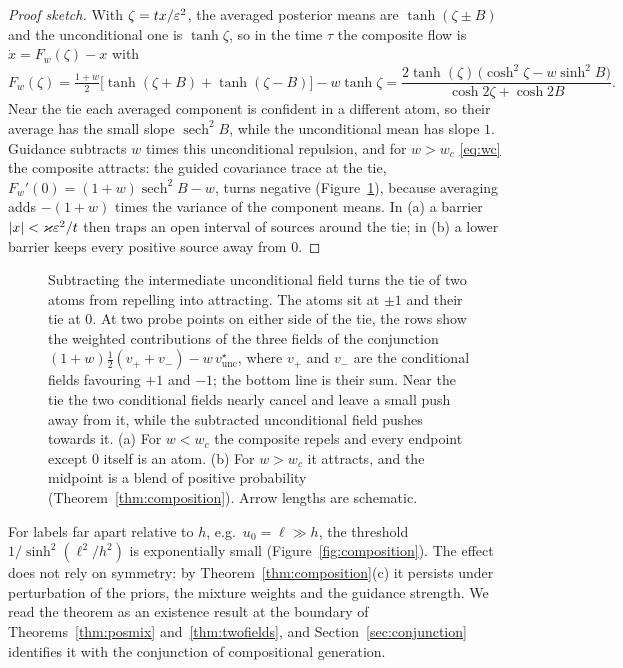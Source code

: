 \documentclass{article} %
\newif\ificlr
\theoremstyle{plain}
\theoremstyle{definition}
\theoremstyle{remark}
\newenvironment{proofsketch}{\begin{proof}[Proof sketch]}{\end{proof}}
\begin{document}
\newcommand{\compositioneq}{%
\begin{equation}
F_w(\zeta)=\tfrac{1+w}2\big[\tanh(\zeta+B)+\tanh(\zeta-B)\big]-w\tanh \zeta
=\frac{2\tanh(\zeta)\,\big(\cosh^2\zeta-w\sinh^2B\big)}{\cosh2\zeta+\cosh2B}.
\label{eq:composition-mean}
\end{equation}}
\ificlr
With $\zeta=tx/\eps^2$, in the time $\tau$ the composite flow is $\dot x=F_w(\zeta)-x$ with
\compositioneq
At the tie the averaged posterior mean has slope $\operatorname{sech}^2B$ and the unconditional one slope~$1$, so the slope $F_w'(0)=(1+w)\operatorname{sech}^2B-w$ turns negative, and the tie attracts, exactly when $w>1/\sinh^2B$; the proof is in Appendix~\ref{apx:pf-composition}.
\else
\begin{proofsketch}
With $\zeta=tx/\eps^2$, the averaged posterior means are $\tanh(\zeta\pm B)$ and the unconditional one
is $\tanh \zeta$, so in the time $\tau$ the composite flow is $\dot x=F_w(\zeta)-x$ with
\compositioneq
Near the tie each averaged component is confident in a different atom, so their average has the
small slope $\operatorname{sech}^2B$, while the unconditional mean has slope $1$. Guidance
subtracts $w$ times this unconditional repulsion, and for $w>w_c$ \eqref{eq:wc} the composite attracts:
the guided covariance trace at the tie, $F_w'(0)=(1+w)\operatorname{sech}^2B-w$, turns negative
(Figure~\ref{fig:tie-mechanism}),
because averaging adds $-(1+w)$ times the variance of the component means. In (a) a barrier
$|x|<\varkappa\varepsilon^2/t$ then traps an open interval of sources around the tie; in (b) a lower
barrier keeps every positive source away from $0$.
\end{proofsketch}
\fi
\begin{figure}[t]
\centering

\caption{Subtracting the intermediate unconditional field turns the tie of two atoms from
repelling into attracting. The atoms sit at $\pm1$ and their tie at $0$. At two probe points on
either side of the tie, the rows show the weighted contributions of the three fields of the
conjunction $(1+w)\tfrac12(v_++v_-)-w\,v^\star_{\mathrm{unc}}$, where $v_+$ and $v_-$ are the
conditional fields favouring $+1$ and $-1$; the bottom line is their sum. Near the tie the two
conditional fields nearly cancel and leave a small push away from it, while the subtracted
unconditional field pushes towards it. (a) For $w<w_c$ the composite repels and every endpoint
except $0$ itself is an atom. (b) For $w>w_c$ it attracts, and the midpoint is a blend of positive
probability (Theorem~\ref{thm:composition}). Arrow lengths are schematic.}
\label{fig:tie-mechanism}
\end{figure}
For labels far apart relative to $h$, e.g.\ $u_0=\ell\gg h$, the threshold $1/\sinh^2(\ell^2/h^2)$
is exponentially small (Figure~\ref{fig:composition}). The effect does not rely on symmetry: by Theorem~\ref{thm:composition}(c) it persists under
perturbation of the priors, the mixture weights and the guidance strength. We read the theorem as an
existence result at the boundary of Theorems~\ref{thm:posmix} and~\ref{thm:twofields}, and
Section~\ref{sec:conjunction} identifies it with the conjunction of compositional generation.
\end{document}

